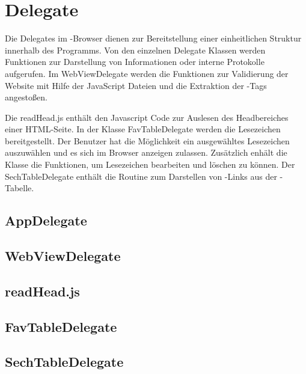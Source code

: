 
\section{Delegate}

Die Delegates im \SECH-Browser dienen zur Bereitstellung einer einheitlichen Struktur innerhalb des Programms. Von den einzelnen Delegate Klassen werden Funktionen zur Darstellung von Informationen oder interne Protokolle aufgerufen. Im WebViewDelegate werden die Funktionen zur Validierung der Website mit Hilfe der JavaScript Dateien und die Extraktion der \SEARCH-Tags angestoßen.

Die readHead.js enthält den Javascript Code zur Auslesen des Headbereiches einer HTML-Seite. In der Klasse FavTableDelegate werden die Lesezeichen bereitgestellt. Der Benutzer hat die Möglichkeit ein ausgewähltes Lesezeichen auszuwählen und es sich im Browser anzeigen zulassen. Zusätzlich enhält die Klasse die Funktionen, um Lesezeichen bearbeiten und löschen zu können. Der SechTableDelegate enthält die Routine zum Darstellen von \SEARCH-Links aus der \SECH-Tabelle. 
\subsection{AppDelegate}
\subsection{WebViewDelegate}
\subsection{readHead.js}
\subsection{FavTableDelegate}
\subsection{SechTableDelegate}

